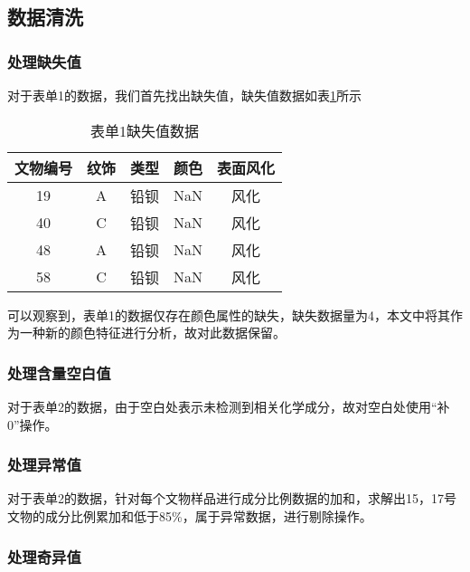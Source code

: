 \documentclass[withoutpreface,bwprint]{cumcmthesis} %
\begin{document}
\subsection{数据清洗}
\subsubsection{处理缺失值}
对于表单1的数据，我们首先找出缺失值，缺失值数据如表\ref{queshi}所示

\begin{table}[!h]
	\centering
	\small
	\caption{表单1缺失值数据}
	\label{queshi}
	\begin{tabular}{@{}ccccc@{}}
		\toprule
		\textbf{文物编号} & \textbf{纹饰} & \textbf{类型} & \textbf{颜色} & \textbf{表面风化} \\ \midrule
		19            & A           & 铅钡          & NaN         & 风化            \\
		40            & C           & 铅钡          & NaN         & 风化            \\
		48            & A           & 铅钡          & NaN         & 风化            \\
		58            & C           & 铅钡          & NaN         & 风化            \\ \bottomrule
	\end{tabular}
\end{table}


可以观察到，表单1的数据仅存在颜色属性的缺失，缺失数据量为4，本文中将其作为一种新的颜色特征进行分析，故对此数据保留。


\subsubsection{处理含量空白值}

对于表单2的数据，由于空白处表示未检测到相关化学成分，故对空白处使用“补0”操作。

\subsubsection{处理异常值}

对于表单2的数据，针对每个文物样品进行成分比例数据的加和，求解出15，17号文物的成分比例累加和低于85\%，属于异常数据，进行剔除操作。

\subsubsection{处理奇异值}
\end{document}

